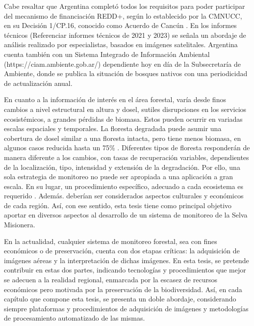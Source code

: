 Cabe resaltar que Argentina completó todos los requisitos para poder participar del mecanismo de financiación REDD+, según lo establecido por la CMNUCC, en su Decisión 1/CP.16, conocido como Acuerdo de Cancún . En los informes técnicos (Referenciar informes técnicos de 2021 y 2023) se señala un abordaje de análisis realizado por especialistas, basados en imágenes satelitales. Argentina cuenta también con un Sistema Integrado de Información Ambiental (https://ciam.ambiente.gob.ar/) dependiente hoy en día de la Subsecretaría de Ambiente, donde se publica la situación de bosques nativos con una periodicidad de actualización anual.

En cuanto a la información de interés en el área forestal, varía desde finos cambios a nivel estructural en altura y dosel, sutiles disrupciones en los servicios ecosistémicos, a grandes pérdidas de biomasa. Estos pueden ocurrir en variadas escalas espaciales y temporales. La floresta degradada puede asumir una cobertura de dosel similar a una floresta intacta, pero tiene menos biomasa, en algunos casos reducida hasta un 75\% \cite{change_report_2006}. Diferentes tipos de floresta responderán de manera diferente a los cambios, con tasas de recuperación variables, dependientes de la localización, tipo, intensidad y extensión de la degradación. Por ello, una sola estrategia de monitoreo no puede ser apropiada a una aplicación a gran escala. En su lugar, un procedimiento específico, adecuado a cada ecosistema es requerido \cite{mitchell_current_2017}. Además. deberían ser considerados aspectos culturales y económicos de cada región. Así, con ese sentido, esta tesis tiene como principal objetivo aportar en diversos aspectos al desarrollo de un sistema de monitoreo de la Selva Misionera.

En la actualidad, cualquier sistema de monitoreo forestal, sea con fines económicos o de preservación, cuenta con dos etapas críticas: la adquisición de imágenes aéreas y la interpretación de dichas imágenes. En esta tesis, se pretende contribuir en estas dos partes, indicando tecnologías y procedimientos que mejor se adecuen a la realidad regional, enmarcada por la escasez de recursos económicos pero motivada por la preservación de la biodiversidad. Así, en cada capítulo que compone esta tesis, se presenta un doble abordaje, considerando siempre plataformas y  procedimientos de adquisición de imágenes y metodologías de procesamiento automatizado de las mismas.
